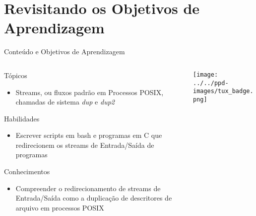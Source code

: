 \documentclass[10pt, compress, aspectratio=169, xcolor={table,usenames,dvipsnames}]{beamer}
\begin{document}
\section{Revisitando os Objetivos de Aprendizagem}
\label{sec:org4138641}
\begin{frame}[label={sec:org431a574}]{Conteúdo e Objetivos de Aprendizagem}
\begin{columns}
\begin{column}{0.65\columnwidth}
\begin{block}{Tópicos}
\begin{itemize}
\item \alert{Streams}, ou \alert{fluxos} padrão em Processos POSIX,
chamadas de sistema \emph{\alert{dup}} e \emph{\alert{dup2}}
\end{itemize}

\begin{block}{Habilidades}
\begin{itemize}
\item Escrever scripts em \alert{bash} e programas  em \alert{C} que \alert{redirecionem} os \alert{streams}
de \alert{Entrada/Saída} de programas
\end{itemize}
\end{block}

\begin{block}{Conhecimentos}
\begin{itemize}
\item Compreender o redirecionamento de streams  de Entrada/Saída como a \alert{duplicação
de descritores de arquivo} em processos POSIX
\end{itemize}
\end{block}
\end{block}
\end{column}

\begin{column}{0.35\columnwidth}
\begin{center}
\texttt{[image: ../../ppd-images/tux\_badge.png]}
\end{center}
\end{column}
\end{columns}
\end{frame}
\maketitle
\end{document}
